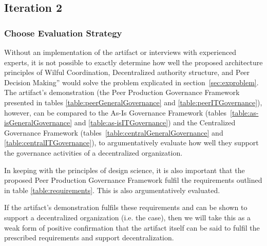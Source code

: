 

\subsection{Iteration 2}
\subsubsection*{Choose Evaluation Strategy}

Without an implementation of the artifact or interviews with experienced experts, it is not possible to exactly determine how well the proposed architecture principles of Wilful Coordination,
Decentralized authority structure, and Peer Decision Making'' would solve the problem explicated in section~\ref{sec:exproblem}. The artifact's demonstration (the Peer Production Governance Framework presented in tables \ref{table:peerGeneralGovernance} and \ref{table:peerITGovernance}), however, can be compared to the As-Is Governance Framework (tables~\ref{table:as-isGeneralGovernance} and \ref{table:as-isITGovernance}) and the Centralized Governance Framework (tables~\ref{table:centralGeneralGovernance}  and \ref{table:centralITGovernance}), to argumentatively evaluate how well they support the governance activities of a decentralized organization. 

In keeping with the principles of design science, it is also important that the proposed Peer Production Governance Framework fulfil the requirements outlined in table \ref{table:requirements}. This is also argumentatively evaluated. 

If the artifact's demonstration fulfils these requirements and can be shown to support a decentralized organization (i.e. the case), then we will take this as a weak form of positive confirmation  that the artifact itself can be said to fulfil the prescribed requirements and support decentralization.


